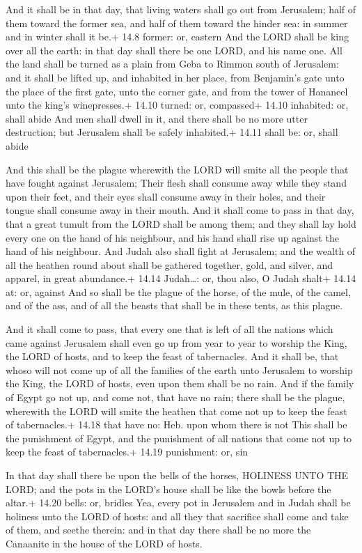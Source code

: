  And it shall be in that day, that living waters shall go
out from Jerusalem; half of them toward the former sea, and half of them
toward the hinder sea: in summer and in winter shall it be.+ 14.8
former: or, eastern  And the LORD shall be king over all the
earth: in that day shall there be one LORD, and his name one.
 All the land shall be turned as a plain from Geba to
Rimmon south of Jerusalem: and it shall be lifted up, and inhabited in
her place, from Benjamin's gate unto the place of the first gate, unto
the corner gate, and from the tower of Hananeel unto the king's
winepresses.+ 14.10 turned: or, compassed+ 14.10 inhabited: or, shall
abide  And men shall dwell in it, and there shall be no
more utter destruction; but Jerusalem shall be safely inhabited.+ 14.11
shall be: or, shall abide

 And this shall be the plague wherewith the LORD will
smite all the people that have fought against Jerusalem; Their flesh
shall consume away while they stand upon their feet, and their eyes
shall consume away in their holes, and their tongue shall consume away
in their mouth.  And it shall come to pass in that day,
that a great tumult from the LORD shall be among them; and they shall
lay hold every one on the hand of his neighbour, and his hand shall rise
up against the hand of his neighbour.  And Judah also shall
fight at Jerusalem; and the wealth of all the heathen round about shall
be gathered together, gold, and silver, and apparel, in great
abundance.+ 14.14 Judah\ldots: or, thou also, O Judah shalt+ 14.14 at:
or, against  And so shall be the plague of the horse, of
the mule, of the camel, and of the ass, and of all the beasts that shall
be in these tents, as this plague.

 And it shall come to pass, that every one that is left
of all the nations which came against Jerusalem shall even go up from
year to year to worship the King, the LORD of hosts, and to keep the
feast of tabernacles.  And it shall be, that whoso will not
come up of all the families of the earth unto Jerusalem to worship the
King, the LORD of hosts, even upon them shall be no rain. 
And if the family of Egypt go not up, and come not, that have no rain;
there shall be the plague, wherewith the LORD will smite the heathen
that come not up to keep the feast of tabernacles.+ 14.18 that have no:
Heb. upon whom there is not  This shall be the punishment
of Egypt, and the punishment of all nations that come not up to keep the
feast of tabernacles.+ 14.19 punishment: or, sin

 In that day shall there be upon the bells of the horses,
HOLINESS UNTO THE LORD; and the pots in the LORD's house shall be like
the bowls before the altar.+ 14.20 bells: or, bridles  Yea,
every pot in Jerusalem and in Judah shall be holiness unto the LORD of
hosts: and all they that sacrifice shall come and take of them, and
seethe therein: and in that day there shall be no more the Canaanite in
the house of the LORD of hosts.
